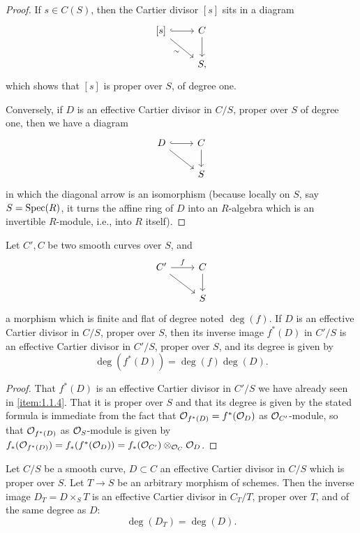 \begin{proof}
If $s \in C(S)$, then the Cartier divisor $[s]$ sits in a diagram
\[
\begin{tikzcd}
{[s]} \arrow[r, hook] \arrow[rd, "\sim"'] & C \arrow[d] \\
& S,
\end{tikzcd}
\]
which shows that $[s]$ is proper over $S$, of degree one.

Conversely, if $D$ is an effective Cartier divisor in $C/S$, proper over $S$ of degree one, then we have a diagram
\[
\begin{tikzcd}
D \arrow[r, hook] \arrow[rd] & C \arrow[d] \\
& S
\end{tikzcd}
\]
in which the diagonal arrow is an isomorphism (because locally on $S$, say $S = \operatorname{Spec}(R)$, it turns the affine ring of $D$ into an $R$-algebra which is an invertible $R$-module, i.e., into $R$ itself).
\end{proof}

\begin{lemma}\label{lem:1.2.8}
Let $C', C$ be two smooth curves over $S$, and
\[
\begin{tikzcd}
C' \arrow[r, "f"] \arrow[rd] & C \arrow[d] \\
& S
\end{tikzcd}
\]
a morphism which is finite and flat of degree noted $\deg(f)$. If $D$ is an effective Cartier divisor in $C/S$, proper over $S$, then its inverse image $f^*(D)$ in $C'/S$ is an effective Cartier divisor in $C'/S$, proper over $S$, and its degree is given by
\[
\deg(f^*(D)) = \deg(f) \deg(D).
\]
\end{lemma}

\begin{proof}
That $f^*(D)$ is an effective Cartier divisor in $C'/S$ we have already seen in \ref{item:1.1.4}. That it is proper over $S$ and that its degree is given by the stated formula is immediate from the fact that $\mathcal{O}_{f^*(D)} = f^*(\mathcal{O}_D)$ as $\mathcal{O}_{C'}$-module, so that $\mathcal{O}_{f^*(D)}$ as $\mathcal{O}_S$-module is given by $f_*(\mathcal{O}_{f^*(D)}) = f_*(f^*(\mathcal{O}_D)) = f_*(\mathcal{O}_{C'}) \otimes_{\mathcal{O}_C} \mathcal{O}_D$.
\end{proof}

\begin{lemma}\label{lem:1.2.9}
Let $C/S$ be a smooth curve, $D \subset C$ an effective Cartier divisor in $C/S$ which is proper over $S$. Let $T \to S$ be an arbitrary morphism of schemes. Then the inverse image $D_T = D \times_S T$ is an effective Cartier divisor in $C_T/T$, proper over $T$, and of the same degree as $D$:
\[
\deg(D_T) = \deg(D).
\]
\end{lemma}

